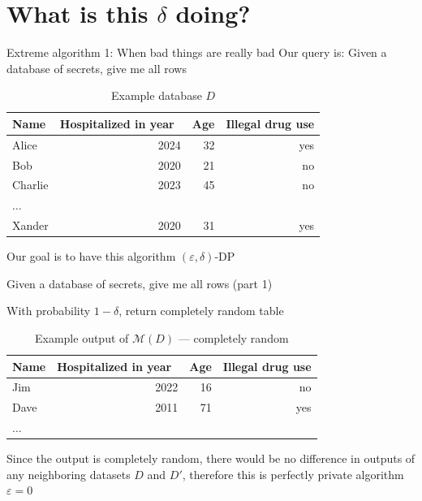 \documentclass[12pt,aspectratio=169,handout]{beamer}
\begin{document}
\section{What is this $\delta$ doing?}


\begin{frame}{Extreme algorithm 1: When bad things are really bad}
Our query is: Given a database of secrets, give me all rows

\begin{table}
\footnotesize
\begin{tabular}{lrrr} \toprule
Name & Hospitalized in year & Age & Illegal drug use \\ \midrule
Alice & 2024 & 32 & yes \\
Bob & 2020 & 21 & no \\
Charlie & 2023 & 45 & no \\
$\ldots$ & & & \\
Xander & 2020 & 31 & yes \\ \bottomrule
\end{tabular}
\caption{Example database $D$}
\end{table}

Our goal is to have this algorithm $(\varepsilon, \delta)$-DP

\end{frame}


\begin{frame}{Given a database of secrets, give me all rows (part 1)}

With probability $1 - \delta$, return completely random table

\begin{table}
\footnotesize
\begin{tabular}{lrrr} \toprule
Name & Hospitalized in year & Age & Illegal drug use \\ \midrule
Jim & 2022 & 16 & no \\
Dave & 2011 & 71 & yes \\
$\ldots$ & & & \\ \bottomrule
\end{tabular}
\caption{Example output of $\mathcal{M}(D)$ --- completely random}
\end{table}

Since the output is completely random, there would be no difference in outputs of any neighboring datasets $D$ and $D'$, therefore this is perfectly private algorithm $\varepsilon = 0$

\end{frame}
\end{document}
